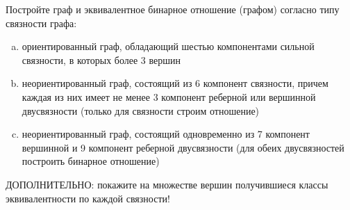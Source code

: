 \question 
Постройте граф и эквивалентное бинарное отношение (графом) согласно типу связности графа:\\
\begin{enumerate} [a)]\setcounter{enumi}{0}
\item ориентированный граф, обладающий шестью компонентами сильной связности, в которых более 3 вершин
\item неориентированный граф, состоящий из 6 компонент связности, причем каждая из них имеет не менее 3 компонент реберной или вершинной двусвязности (только для связности строим отношение)
\item неориентированный граф, состоящий одновременно из 7 компонент вершинной и 9 компонент реберной двусвязности (для обеих двусвязностей построить бинарное отношение)
\end{enumerate} 
ДОПОЛНИТЕЛЬНО: покажите на множестве вершин получившиеся классы эквивалентности по каждой связности!